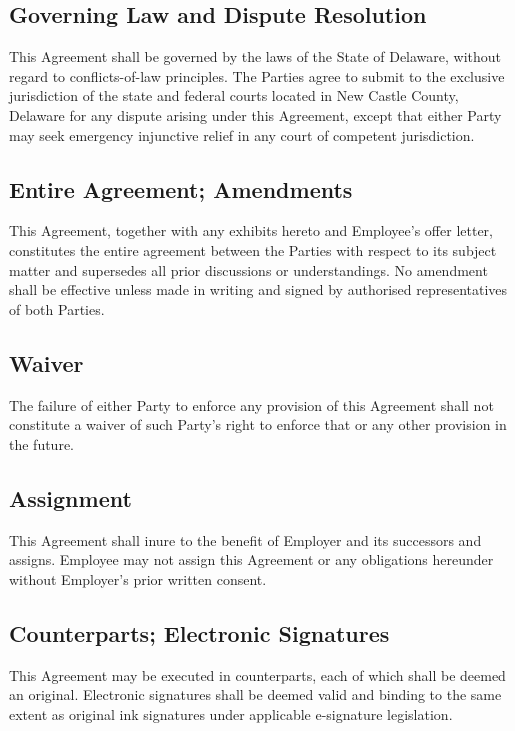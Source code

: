\documentclass[11pt,a4paper]{article}
\begin{document}
\subsection{Governing Law and Dispute Resolution}
\noindent
This Agreement shall be governed by the laws of the State of Delaware, without regard
to conflicts-of-law principles. The Parties agree to submit to the exclusive jurisdiction
of the state and federal courts located in New Castle County, Delaware for any dispute
arising under this Agreement, except that either Party may seek emergency injunctive
relief in any court of competent jurisdiction.

\subsection{Entire Agreement; Amendments}
\noindent
This Agreement, together with any exhibits hereto and Employee's offer letter, constitutes
the entire agreement between the Parties with respect to its subject matter and supersedes
all prior discussions or understandings. No amendment shall be effective unless made in
writing and signed by authorised representatives of both Parties.

\subsection{Waiver}
\noindent
The failure of either Party to enforce any provision of this Agreement shall not constitute
a waiver of such Party's right to enforce that or any other provision in the future.

\subsection{Assignment}
\noindent
This Agreement shall inure to the benefit of Employer and its successors and assigns.
Employee may not assign this Agreement or any obligations hereunder without Employer's
prior written consent.

\subsection{Counterparts; Electronic Signatures}
\noindent
This Agreement may be executed in counterparts, each of which shall be deemed an original.
Electronic signatures shall be deemed valid and binding to the same extent as original
ink signatures under applicable e-signature legislation.

\end{document}
